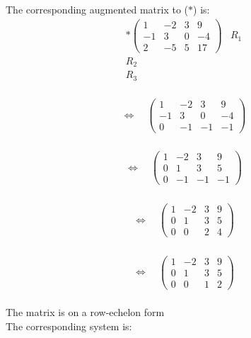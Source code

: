 \documentclass{jhwhw}
\begin{document}
The corresponding augmented matrix to (\(\ast\)) is:\\

\begin{align*} \ast \begin{pmatrix} 1 & -2 & 3 & 9 \\ -1 & 3 & 0 & -4 \\ 2 & -5 & 5 & 17 \end{pmatrix} & R_1 \\ R_2 \\  R_3 \end{align*}\\

\begin{align*} \Leftrightarrow \quad \begin{pmatrix} 1 &-2 & 3 & 9 \\ -1 & 3 & 0 & -4 \\ 0 & -1 & -1 & -1\end{pmatrix} \end{align*}\\

\begin{align*} \Leftrightarrow \quad \begin{pmatrix} 1 &-2 & 3 & 9 \\ 0 & 1 & 3 & 5 \\ 0 & -1 & -1 & -1\end{pmatrix} \end{align*}
\\

\begin{align*} \Leftrightarrow \quad \begin{pmatrix} 1 &-2 & 3 & 9 \\ 0 & 1 & 3 & 5 \\ 0 & 0 & 2 & 4 \end{pmatrix} \end{align*} \\

\begin{align*} \Leftrightarrow \quad \begin{pmatrix} 1 &-2 & 3 & 9 \\ 0 & 1 & 3 & 5 \\ 0 & 0 & 1 & 2 \end{pmatrix} \end{align*} \\

The matrix is on a row-echelon form\\
The corresponding system is:\\
\end{document}
